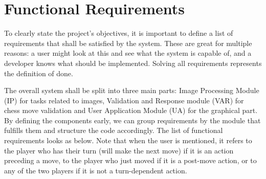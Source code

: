 
\section{Functional Requirements} \label{sec:functional-requirements}

To clearly state the project's objectives, it is important to define a list of requirements that shall be satisfied by the system. These are great for multiple reasons: a user might look at this and see what the system is capable of, and a developer knows what should be implemented. Solving all requirements represents the definition of done.

The overall system shall be split into three main parts: Image Processing Module (IP) for tasks related to images, Validation and Response module (VAR) for chess move validation and User Application Module (UA) for the graphical part. By defining the components early, we can group requirements by the module that fulfills them and structure the code accordingly. The list of functional requirements looks as below. Note that when the user is mentioned, it refers to the player who has their turn (will make the next move) if it is an action preceding a move, to the player who just moved if it is a post-move action, or to any of the two players if it is not a turn-dependent action.

